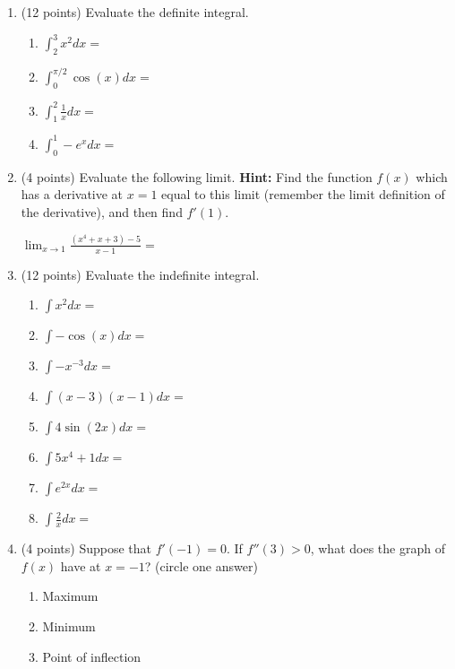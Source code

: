 \documentclass[11pt]{article}
\begin{document}
\begin{enumerate}[itemsep=30pt]
\newpage


\item (12 points) Evaluate the definite integral.
\begin{enumerate}[itemsep=80pt]
    \item $\int_{2}^{3} x^2 dx = $
    \item $\int_{0}^{\pi/2} \cos(x) dx = $
    \item $\int_{1}^{2} \frac{1}{x} dx = $
    \item $\int_{0}^{1} -e^x dx = $
\end{enumerate}
\vspace{60pt}


\item (4 points) Evaluate the following limit. \textbf{Hint:} Find the function $f(x)$ which has a derivative at $x=1$ equal to this limit (remember the limit definition of the derivative), and then find $f'(1)$.

\vspace{10pt}
$\displaystyle{\lim_{x \to 1} \frac{(x^4+x+3) - 5}{x-1} = }$


\newpage


\item (12 points) Evaluate the indefinite integral.
\begin{enumerate}[itemsep=40pt]
    \item $\int x^2 dx = $
    \item $\int -\cos(x) dx = $
    \item $\int -x^{-3} dx = $
    \item $\int (x-3)(x-1) dx = $
    \item $\int 4\sin(2x)dx = $
    \item $\int 5x^4+1dx  =$
    \item $\int e^{2x} dx = $
    \item $\int \frac{2}{x} dx  =$
\end{enumerate}

\vspace{10 mm}

\item (4 points) Suppose that $f'(-1)=0$.  If $f''(3) > 0$, what does the graph of $f(x)$ have at $x=-1$? (circle one answer)
\begin{enumerate}
    \item Maximum
    \item Minimum
    \item Point of inflection
\end{enumerate}



\end{enumerate}
\end{document}
